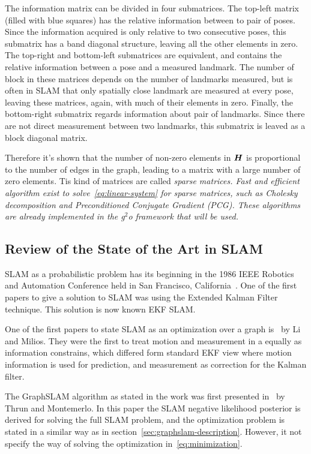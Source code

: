 The information matrix can be divided in four submatrices. The top-left matrix (filled with blue squares) has the relative information between to pair of poses. Since the information acquired is only relative to two consecutive poses, 
this submatrix has a band diagonal structure, leaving all the other elements in zero. The top-right and bottom-left submatrices are equivalent, and contains the relative information between a pose and a measured landmark. The number of block in these matrices depends on the number of landmarks measured, but is often in SLAM that only spatially close landmark are measured at every pose, leaving these matrices, again, with much of their elements in zero. Finally, the bottom-right submatrix regards information about pair of landmarks. Since there are not direct measurement between two landmarks, this submatrix is leaved as a block diagonal matrix.

Therefore it's shown that the number of non-zero elements in $\boldsymbol{H}$ is proportional to the number of edges in the graph, leading to a matrix with a large number of zero elements. Tis kind of matrices are called \it{sparse matrices}. Fast and efficient algorithm exist to solve~\eqref{eq:linear-system} for sparse matrices, such as Cholesky decomposition and Preconditioned Conjugate Gradient (PCG). These algorithms are already implemented in the g$^2$o framework that will be used.

\subsection{Review of the State of the Art in SLAM}
\label{sec:state-of-the-art}

SLAM as a probabilistic problem has its beginning in the 1986 IEEE Robotics and Automation Conference held in San Francisco, California~\cite{tutorial}. One of the first papers to give a solution to SLAM was \cite{ekfslam} using the Extended Kalman Filter technique. This solution is now known EKF SLAM.

One of the first papers to state SLAM as an optimization over a graph is~\cite{firstgraph} by Li and Milios. They were the first to treat motion and measurement in a equally as information constrains, which differed form standard EKF view where motion information is used for prediction, and measurement as correction for the Kalman filter.

The GraphSLAM algorithm as stated in the work was first presented in~\cite{graphslam} by Thrun and Montemerlo. In this paper the SLAM negative likelihood posterior is derived for solving the full SLAM problem, and the optimization problem is stated in a similar way as in section~\ref{sec:graphslam-description}. However, it not specify the way of solving the optimization in~\eqref{eq:minimization}. 

